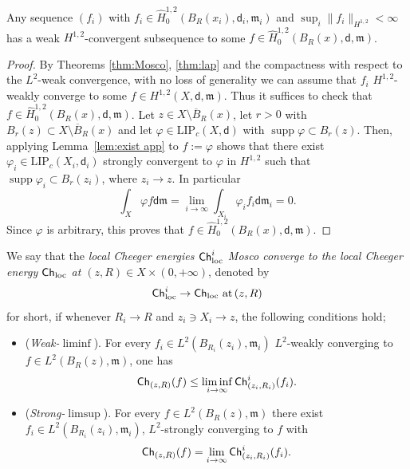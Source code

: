 \documentclass[a4paper,11pt,reqno]{article}
\numberwithin{equation}{section}
\theoremstyle{plain}
\theoremstyle{definition}
\theoremstyle{remark}
\let\altphi\phi
\let\phi\varphi
\let\varphi\altphi
\let\altphi\undefined
\DeclareMathOperator{\supp}{supp}
\newcommand{\Ch}{{\sf Ch}}
\newcommand{\dist}{\mathsf{d}}
\newcommand{\meas}{\mathfrak{m}}
\begin{document}
{\begin{proposition}\label{prop:compact}
Any sequence $(f_i)$ with $f_i \in \hat{H}_0^{1, 2}(B_R(x_i), \dist_i, \meas_i)$ and $\sup_i\|f_i\|_{H^{1, 2}}<\infty$ has a weak 
$H^{1, 2}$-convergent subsequence to some $f \in \hat{H}^{1, 2}_0(B_R(x), \dist, \meas)$.
\end{proposition}
\begin{proof}
By Theorems \ref{thm:Mosco}, \ref{thm:lap} and the compactness with respect to the $L^2$-weak convergence, 
with no loss of generality  we can assume that $f_i$ $H^{1, 2}$-weakly converge to some $f \in H^{1, 2}(X, \dist, \meas)$.
Thus it suffices to check that $f \in \hat{H}^{1, 2}_0(B_R(x), \dist, \meas)$.
Let $z \in X \setminus \overline{B}_R(x)$, let $r>0$ with $B_r(z) \subset  X \setminus \overline{B}_R(x)$ and let $\phi \in \mathrm{LIP}_c(X, \dist)$ with $\supp \phi \subset B_r(z)$.
Then, applying Lemma~\ref{lem:exist app} to $f:=\phi$ shows that there exist $\phi_i \in \mathrm{LIP}_c(X_i, \dist_i)$ 
strongly convergent to $\phi$ in $H^{1, 2}$ such that $\supp \phi_i\subset B_r(z_i)$, where $z_i \to z$.
In particular
$$
\int_X\phi f\dist \meas =\lim_{i \to \infty}\int_{X_i}\phi_if_i\dist \meas_i=0.
$$
Since $\phi$ is arbitrary, this proves that $f \in \hat{H}_0^{1, 2}(B_R(x), \dist, \meas)$.
\end{proof}

\begin{definition}\label{def:local mosco}
We say that the \textit{local Cheeger energies $\Ch_{\mathrm{loc}}^i$ Mosco converge to 
the local Cheeger energy $\Ch_{\mathrm{loc}}$ at $(z, R) \in X \times (0, +\infty)$}, denoted by 
\begin{equation}\label{eq:local mosco}
\Ch_{\mathrm{loc}}^i \to \Ch_{\mathrm{loc}}\,\,\mathrm{at}\,(z, R)
\end{equation}
for short, if whenever $R_i \to R$ and $z_i\ni X_i \to z$, the following conditions hold;
\begin{itemize}
\item[(a)] (\emph{Weak-$\liminf$}). For every $f_i\in L^2(B_{R_i}(z_i),\meas_i)$ $L^2$-weakly converging to $f\in L^2(B_R(z),\meas)$, one has
\[ \Ch_{(z, R)}(f)\le \liminf_{i\to\infty} \Ch^i_{(z_i, R_i)}(f_i).\]
\item[(b)] (\emph{Strong-$\limsup$}). For every $f \in L^2(B_R(z),\meas)$ there exist $f_i\in L^2(B_{R_i}(z_i),\meas_i)$, $L^2$-strongly converging to $f$ with
\begin{equation}\label{eq:optimal_locChee} \Ch_{(z, R)}(f)=\lim_{i\to \infty} \Ch^i_{(z_i, R_i)}(f_i).\end{equation}
\end{itemize}
\end{definition}

}
\end{document}
